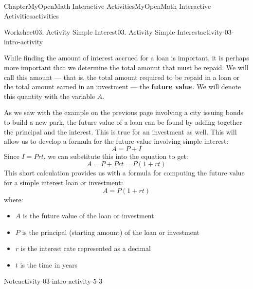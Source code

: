 \documentclass[oneside,10pt,]{book}
\newcommand{\blocktitlefont}{\relax}
\newcommand{\ptxlistdisc}{\raisebox{0.3ex}{\textbullet}}
\newcommand{\terminology}[1]{\textbf{#1}}
\newlength{\fillinmaxwidth}
\newlength{\fillincontract}
\newlength{\charmaxwidth}\setlength{\charmaxwidth}{0.5em}
\newlength{\charminwidth}\setlength{\charminwidth}{0.1em}
\newlength{\fillinheight}
\newcommand{\fillintext}[1]{%
\setlength{\fillinmaxwidth}{#1\charmaxwidth}%
\setlength{\fillincontract}{#1\charminwidth}%
\setlength{\fillinheight}{\baselineskip}\addtolength{\fillinheight}{1.2pt}%
\strut\nobreak\leaders\vbox{\hrule width 0.3pt height 0.3pt \vskip -1.2pt}\hskip 1\fillinmaxwidth minus \fillincontract\nobreak\strut%
}
\begin{document}
\begin{chapterptx}{Chapter}{MyOpenMath Interactive Activities}{}{MyOpenMath Interactive Activities}{}{}{activities}
\begin{worksheet-section}{Worksheet}{03. Activity Simple Interest}{}{03. Activity Simple Interest}{}{}{activity-03-intro-activity}
%
\clearpage
While finding the amount of interest accrued for a loan is important, it is perhaps more important that we determine the total amount that must be repaid. We will call this amount — that is, the total amount required to be repaid in a loan or the total amount earned in an investment — the \terminology{future value}. We will denote this quantity with the variable \(A\).%
\par
As we saw with the example on the previous page involving a city issuing bonds to build a new park, the future value of a loan can be found by adding together the principal and the interest. This is true for an investment as well. This will allow us to develop a formula for the future value involving simple interest:%
\begin{equation*}
A = P + I
\end{equation*}
Since \(I = Prt\), we can substitute this into the equation to get:%
\begin{equation*}
A = P + Prt = P(1 + rt)
\end{equation*}
This short calculation provides us with a formula for computing the future value for a simple interest loan or investment:%
\begin{equation*}
A = P(1 + rt)
\end{equation*}
where:%
\begin{itemize}[label=\ptxlistdisc]
\item{}\(A\) is the future value of the loan or investment%
\item{}\(P\) is the principal (starting amount) of the loan or investment%
\item{}\(r\) is the interest rate represented as a decimal%
\item{}\(t\) is the time in years%
\end{itemize}
%
\begin{note}{Note}{}{activity-03-intro-activity-5-3}%

\end{note}
\end{worksheet-section}
\end{chapterptx}
\end{document}

